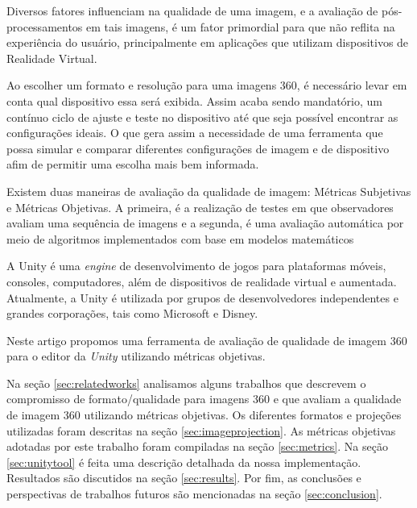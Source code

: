 \documentclass[conference]{IEEEtran}
\begin{document}
Diversos fatores influenciam na qualidade de uma imagem, e a avaliação de pós-processamentos em tais imagens, é um fator primordial para que não reflita na experiência do usuário, principalmente em aplicações que utilizam dispositivos de Realidade Virtual.


Ao escolher um formato e resolução para uma imagens 360, é necessário levar em conta qual dispositivo essa será exibida. Assim acaba sendo mandatório, um contínuo ciclo de ajuste e teste no dispositivo até que seja possível encontrar as configurações ideais. O que gera assim a necessidade de uma ferramenta que possa simular e comparar diferentes configurações de imagem e de dispositivo afim de permitir uma escolha mais bem informada.

Existem duas maneiras de avaliação da qualidade de imagem: Métricas Subjetivas e Métricas Objetivas. A primeira, é a realização de testes em que observadores avaliam uma sequência de imagens e a segunda, é uma avaliação automática por meio de algoritmos implementados com base em modelos matemáticos

A Unity é uma \textit{engine} de desenvolvimento de jogos para plataformas móveis, consoles, computadores, além de dispositivos de realidade virtual e aumentada. Atualmente, a Unity é utilizada por grupos de desenvolvedores independentes e grandes corporações, tais como Microsoft e Disney.

Neste artigo propomos uma ferramenta de avaliação de qualidade de imagem 360 para o editor da \textit{Unity} utilizando métricas objetivas.

Na seção \ref{sec:relatedworks} analisamos alguns trabalhos que descrevem o compromisso de formato/qualidade para imagens 360 e que avaliam a qualidade de imagem 360 utilizando métricas objetivas. Os diferentes formatos e projeções utilizadas foram descritas na seção \ref{sec:imageprojection}. As métricas objetivas adotadas por este trabalho foram compiladas na seção \ref{sec:metrics}. Na seção \ref{sec:unitytool} é feita uma descrição detalhada da nossa implementação. Resultados são discutidos na seção \ref{sec:results}. Por fim, as conclusões e perspectivas de trabalhos futuros são mencionadas na seção \ref{sec:conclusion}.
\end{document}

